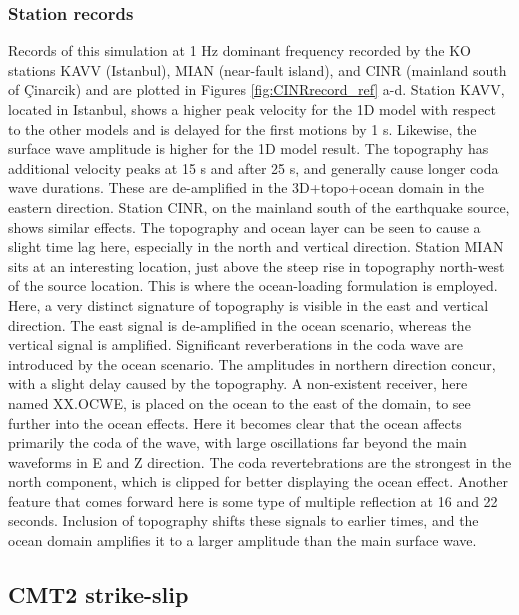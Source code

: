 \documentclass[../Text/00main.tex]{subfiles}
\begin{document}
\subsubsection{Station records}

Records of this simulation at 1 Hz dominant frequency recorded by the KO stations KAVV (Istanbul), MIAN (near-fault island), and CINR (mainland south of Çinarcik) and are plotted in Figures \ref{fig:CINRrecord_ref} a-d. Station KAVV, located in Istanbul, shows a higher peak velocity for the 1D model with respect to the other models and is delayed for the first motions by 1 s. Likewise, the surface wave amplitude is higher for the 1D model result. The topography has additional velocity peaks at 15 s and after 25 s, and generally cause longer coda wave durations. These are de-amplified in the 3D+topo+ocean domain in the eastern direction. Station CINR, on the mainland south of the earthquake source, shows similar effects. The topography and ocean layer can be seen to cause a slight time lag here, especially in the north and vertical direction. Station MIAN sits at an interesting location, just above the steep rise in topography north-west of the source location. This is where the ocean-loading formulation is employed. Here, a very distinct signature of topography is visible in the east and vertical direction. The east signal is de-amplified in the ocean scenario, whereas the vertical signal is amplified. Significant reverberations in the coda wave are introduced by the ocean scenario.  The amplitudes in northern direction concur, with a slight delay caused by the topography. A non-existent receiver, here named XX.OCWE, is placed on the ocean to the east of the domain, to see further into the ocean effects. Here it becomes clear that the ocean affects primarily the coda of the wave, with large oscillations far beyond the main waveforms in E and Z direction. The coda revertebrations are the strongest in the north component, which is clipped for better displaying the ocean effect. Another feature that comes forward here is some type of multiple reflection at 16 and 22 seconds. Inclusion of topography shifts these signals to earlier times, and the ocean domain amplifies it to a larger amplitude than the main surface wave.


\subsection{CMT2 strike-slip}
\end{document}
